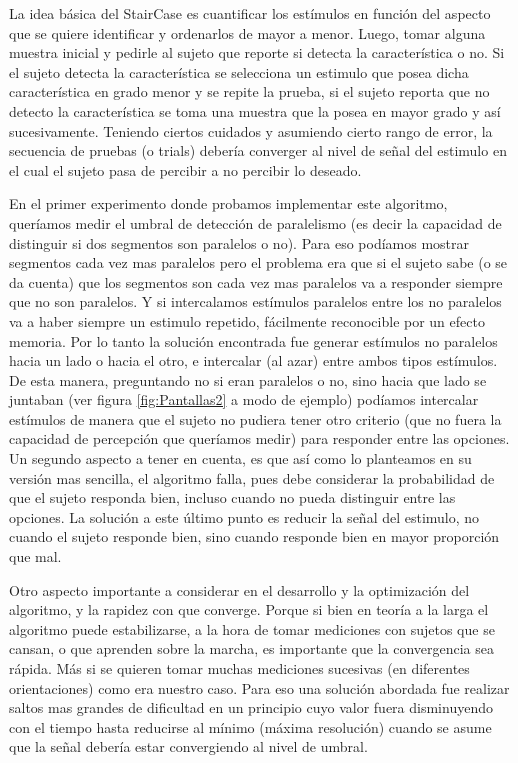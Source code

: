 \documentclass{article}
\begin{document}
    La idea básica del StairCase es cuantificar los estímulos en función del aspecto que se quiere identificar y ordenarlos de mayor a menor. Luego, tomar alguna muestra inicial y pedirle al sujeto que reporte si detecta la característica o no. Si el sujeto detecta la característica se selecciona un estimulo que posea dicha característica en grado menor y se repite la prueba, si el sujeto reporta que no detecto la característica se toma una muestra que la posea en mayor grado y así sucesivamente. Teniendo ciertos cuidados y asumiendo cierto rango de error, la secuencia de pruebas (o trials) debería converger al nivel de señal del estimulo en el cual el sujeto pasa de percibir a no percibir lo deseado. 
    
    En el primer experimento donde probamos implementar este algoritmo, queríamos medir el umbral de 
    detección de paralelismo (es decir la capacidad de distinguir si dos segmentos son paralelos o no). Para eso podíamos mostrar segmentos cada vez mas paralelos pero el problema era que si el sujeto sabe (o se da cuenta) que los segmentos son cada vez mas paralelos va a responder siempre que no son paralelos. Y si intercalamos estímulos paralelos entre los no paralelos va a haber siempre un estimulo repetido, fácilmente reconocible por un efecto memoria. Por lo tanto la solución encontrada fue generar estímulos no paralelos hacia un lado o hacia el otro, e intercalar (al azar) entre ambos tipos estímulos. De esta manera, preguntando no si eran paralelos o no, sino hacia que lado se juntaban (ver figura \ref{fig:Pantallas2} a modo de ejemplo) podíamos intercalar estímulos de manera que el sujeto no pudiera tener otro criterio (que no fuera la capacidad de percepción que queríamos medir) para responder entre las opciones. Un segundo aspecto a tener en cuenta, es que así como lo planteamos en su versión mas sencilla, el algoritmo falla, pues debe considerar la probabilidad de que el sujeto responda bien, incluso cuando no pueda distinguir entre las opciones. La solución a este último punto es reducir la señal del estimulo, no cuando el sujeto responde bien, sino cuando responde bien en mayor proporción que mal. 
    
    Otro aspecto importante a considerar en el desarrollo y la optimización del algoritmo, y la rapidez con que converge. Porque si bien en teoría a la larga el algoritmo puede estabilizarse, a la hora de tomar mediciones con sujetos que se cansan, o que aprenden sobre la marcha, es importante que la convergencia sea rápida. Más si se quieren tomar muchas mediciones sucesivas (en diferentes orientaciones) como era nuestro caso. Para eso una solución abordada fue realizar saltos mas grandes de dificultad en un principio cuyo valor fuera disminuyendo con el tiempo hasta reducirse al mínimo (máxima resolución) cuando se asume que la señal debería estar convergiendo al nivel de umbral. 
    
\end{document}
